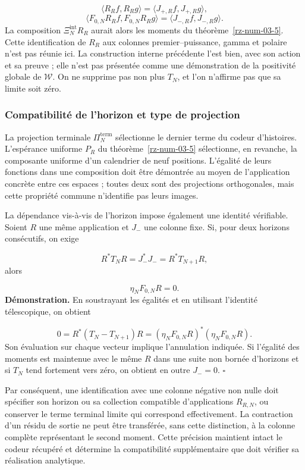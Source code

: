\[
\langle R_Rf,R_Rg\rangle
=\langle J_{+,R}f,J_{+,R}g\rangle,
\]
\[
\langle F_{0,N}R_Rf,F_{0,N}R_Rg\rangle
=\langle J_{-,R}f,J_{-,R}g\rangle.
\]
La composition \(\Xi_N^{\mathrm{int}}R_R\) aurait alors les moments du théorème~\ref{rz-num-03-5}. Cette identification de \(R_R\) aux colonnes premier–puissance, gamma et polaire n’est pas réunie ici. La construction interne précédente l’est bien, avec son action et sa preuve ; elle n’est pas présentée comme une démonstration de la positivité globale de \(\mathscr W\). On ne supprime pas non plus \(T_N\), et l’on n’affirme pas que sa limite soit zéro.

\subsubsection*{Compatibilité de l'horizon et type de projection}
La projection terminale \(\Pi_N^{\mathrm{term}}\) sélectionne le dernier terme du codeur d'histoires. L'espérance uniforme \(P_R\) du théorème~\ref{rz-num-03-5} sélectionne, en revanche, la composante uniforme d'un calendrier de neuf positions. L'égalité de leurs fonctions dans une composition doit être démontrée au moyen de l'application concrète entre ces espaces ; toutes deux sont des projections orthogonales, mais cette propriété commune n'identifie pas leurs images.

La dépendance vis-à-vis de l'horizon impose également une identité vérifiable. Soient \(R\) une même application et \(J_-\) une colonne fixe. Si, pour deux horizons consécutifs, on exige

\[
R^*T_NR=J_-^*J_-=R^*T_{N+1}R,
\]
alors

\[
\eta_NF_{0,N}R=0.
\]
\textbf{Démonstration.} En soustrayant les égalités et en utilisant l’identité télescopique, on obtient

\[
0=R^*(T_N-T_{N+1})R
=(\eta_NF_{0,N}R)^*(\eta_NF_{0,N}R).
\]
Son évaluation sur chaque vecteur implique l’annulation indiquée. Si l’égalité des moments est maintenue avec le même \(R\) dans une suite non bornée d’horizons et si \(T_N\) tend fortement vers zéro, on obtient en outre \(J_-=0\). \hfill\(\square\)

Par conséquent, une identification avec une colonne négative non nulle doit spécifier son horizon ou sa collection compatible d'applications \(R_{R,N}\), ou conserver le terme terminal limite qui correspond effectivement. La contraction d'un résidu de sortie ne peut être transférée, sans cette distinction, à la colonne complète représentant le second moment. Cette précision maintient intact le codeur récupéré et détermine la compatibilité supplémentaire que doit vérifier sa réalisation analytique.

